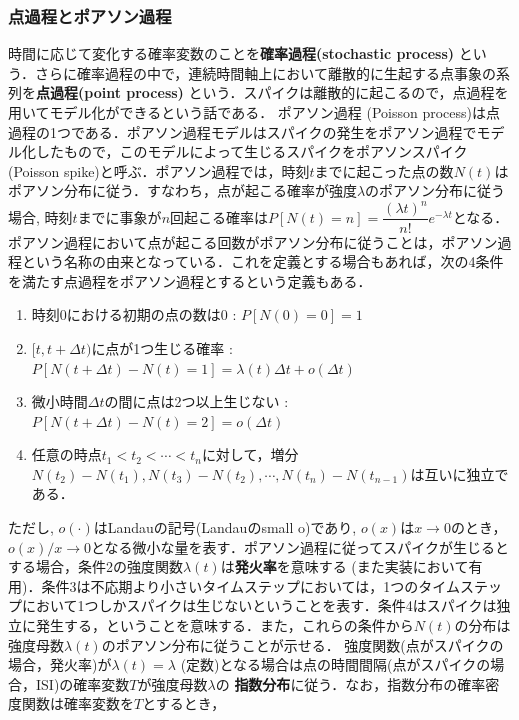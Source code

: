 \subsubsection{点過程とポアソン過程}
時間に応じて変化する確率変数のことを\textbf{確率過程(stochastic process)} という．さらに確率過程の中で，連続時間軸上において離散的に生起する点事象の系列を\textbf{点過程(point process)} という．スパイクは離散的に起こるので，点過程を用いてモデル化ができるという話である．
ポアソン過程 (Poisson process)は点過程の1つである．ポアソン過程モデルはスパイクの発生をポアソン過程でモデル化したもので，このモデルによって生じるスパイクをポアソンスパイク(Poisson spike)と呼ぶ．ポアソン過程では，時刻$t$までに起こった点の数$N(t)$はポアソン分布に従う．すなわち，点が起こる確率が強度$\lambda$のポアソン分布に従う場合, 時刻$t$までに事象が$n$回起こる確率は$P[N(t)=n]=\dfrac{(\lambda t)^{n}}{n !} e^{-\lambda t}$となる． 
ポアソン過程において点が起こる回数がポアソン分布に従うことは，ポアソン過程という名称の由来となっている．これを定義とする場合もあれば，次の4条件を満たす点過程をポアソン過程とするという定義もある．
\begin{enumerate}
\item 時刻0における初期の点の数は0 : $P[N(0)=0]=1$ 
\item $[t, t+\Delta t)$に点が1つ生じる確率 : $P[N(t+\Delta t)-N(t)=1]=\lambda(t)\Delta t+o(\Delta t)$
\item 微小時間$\Delta t$の間に点は2つ以上生じない : $P[N(t+\Delta t)-N(t)=2]=o(\Delta t)$
\item 任意の時点$t_1 < t_2 < \cdots< t_n$に対して，増分 $N(t_2)-N(t_1), N(t_3)-N(t_2), \cdots, N(t_n)-N(t_{n−1})$は互いに独立である．
\end{enumerate}
ただし, $o(\cdot)$はLandauの記号(Landauのsmall o)であり, $o(x)$は$x\to 0$のとき，$o(x)/x\to 0$となる微小な量を表す．ポアソン過程に従ってスパイクが生じるとする場合，条件2の強度関数$\lambda(t)$は\textbf{発火率}を意味する (また実装において有用)．条件3は不応期より小さいタイムステップにおいては，1つのタイムステップにおいて1つしかスパイクは生じないということを表す．条件4はスパイクは独立に発生する，ということを意味する．また，これらの条件から$N(t)$の分布は強度母数$\lambda(t)$のポアソン分布に従うことが示せる．
強度関数(点がスパイクの場合，発火率)が$\lambda(t)=\lambda$ (定数)となる場合は点の時間間隔(点がスパイクの場合，ISI)の確率変数$T$が強度母数$\lambda$の \textbf{指数分布}に従う．なお，指数分布の確率密度関数は確率変数を$T$とするとき，
